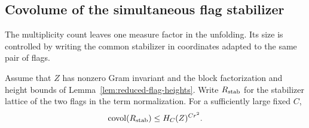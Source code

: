 \subsection{Covolume of the simultaneous flag stabilizer}

The multiplicity count leaves one measure factor in the unfolding. Its size is controlled by writing the common stabilizer in coordinates adapted to the same pair of flags.

\begin{proposition}\label{prop:flag-stabilizer-covolume}
Assume that \(Z\) has nonzero Gram invariant and the block
factorization and height bounds of Lemma~\ref{lem:reduced-flag-heights}. Write \(R_{\rm stab}\) for the stabilizer lattice of the two flags in the term normalization. For a sufficiently large fixed \(C\), 
\[
 \operatorname{covol}(R_{\rm stab})\le H_C(Z)^{Cr^2}.
\]

\end{proposition}

